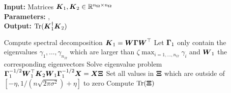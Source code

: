 \hspace*{\algorithmicindent} \textbf{Input:} Matrices $\boldsymbol{K}_1, \boldsymbol{K}_2 \in \mathbb{R}^{n_{\boldsymbol{\Omega}} \times n_{\boldsymbol{\Omega}}}$ \\
\hspace*{\algorithmicindent} \textbf{Parameters:} , \\
\hspace*{\algorithmicindent} \textbf{Output:} $\operatorname{Tr}(\boldsymbol{K}_1^{\dagger} \boldsymbol{K}_2)$
\begin{algorithmic}[1]
    \State Compute spectral decomposition $\boldsymbol{K}_1 = \boldsymbol{W} \boldsymbol{\Gamma} \boldsymbol{W}^{\top}$
    \State Let $\boldsymbol{\Gamma}_1$ only contain the eigenvalues $\gamma_1, \dots, \gamma_{n_{\Omega}}$ which are larger than $\zeta \max_{i=1, \dots, n_{\Omega}} \gamma_i$ and $\boldsymbol{W}_1$ the corresponding eigenvectors
    \State Solve eigenvalue problem $\boldsymbol{\Gamma}_1^{-1/2} \boldsymbol{W}_1^{\top} \boldsymbol{K}_2 \boldsymbol{W}_1 \boldsymbol{\Gamma}_1^{-1/2} \boldsymbol{X} = \boldsymbol{X} \boldsymbol{\Xi}$
    \State Set all values in $\boldsymbol{\Xi}$ which are outside of $[-\eta, 1 / (n \sqrt{2 \pi \sigma^2}) + \eta]$ to zero
    \State Compute $\operatorname{Tr}(\boldsymbol{\Xi})$
\end{algorithmic}
